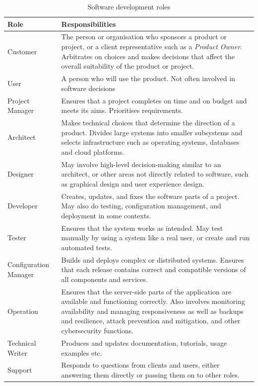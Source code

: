 \label{A39}
\begin{table}[htbp]
\begin{tabular}{p{2.5cm} | p{10cm}}
\textbf{Role} & \textbf{Responsibilities} \\
\hline
Customer & The person or organisation who sponsors a product or project, or a client representative such as a \emph{Product Owner}. Arbitrates on choices and makes decisions that affect the overall suitability of the product or project. \\
\hline
User & A person who will use the product. Not often involved in software decisions \\
\hline
Project Manager & Ensures that a project completes on time and on budget and meets its aims. Prioritises requirements. \\
\hline
Architect & Makes technical choices that determine the direction of a product. Divides large systems into smaller subsystems and selects infrastructure such as operating systems, databases and cloud platforms. \\
\hline
Designer & May involve high-level decision-making similar to an architect, or other areas not directly related to software, such as graphical design and user experience design. \\
\hline
Developer & Creates, updates, and fixes the software parts of a project. May also do testing, configuration management, and deployment in some contexts. \\
\hline
Tester & Ensures that the system works as intended. May test manually by using a system like a real user, or create and run automated tests. \\
\hline
Configuration Manager & Builds and deploys complex or distributed systems. Ensures that each release contains correct and compatible versions of all components and services. \\
\hline
Operation & Ensures that the server-side parts of the application are available and functioning correctly. Also involves monitoring availability and managing responsiveness as well as backups and resilience, attack prevention and mitigation, and other cybersecurity functions. \\
\hline
Technical Writer & Produces and updates documentation, tutorials, usage examples etc. \\
\hline
Support & Responds to questions from clients and users, either answering them directly or passing them on to other roles. \\
\hline
\end{tabular}
\caption{Software development roles\label{table:roles}}
\end{table}

